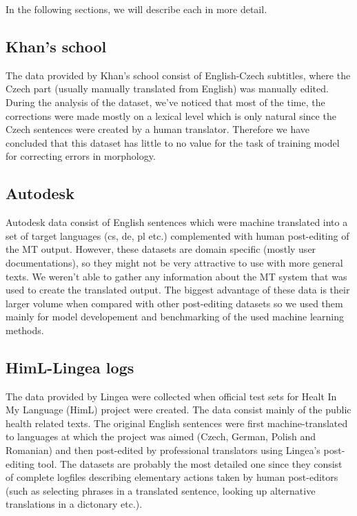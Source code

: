 In the following sections, we will describe each in more detail.

\subsection{Khan's school}

The data provided by Khan's school consist of English-Czech subtitles,
where the Czech part (usually manually translated from English) was manually
edited. During the analysis of the dataset,
we've noticed that most of the time, the corrections were made
mostly on a lexical level which is only natural since the Czech sentences
were created by a human translator.
Therefore we have concluded that this dataset has little to no value
for the task of training model for correcting errors in morphology.


\subsection{Autodesk}

Autodesk data consist of English sentences which were machine translated into
a set of target languages (cs, de, pl etc.) complemented with human post-editing
of the MT output. However, these datasets are domain specific (mostly user documentations),
so they might not be very attractive to use with more general texts.
We weren't able to gather any information about the MT system that was used
to create the translated output. The biggest advantage of these data is
their larger volume when compared with other post-editing datasets so we
used them mainly for model developement and benchmarking of the used machine
learning methods.

\subsection{HimL-Lingea logs}

The data provided by Lingea were collected when official test sets for
Healt In My Language (HimL) project were
created. The data consist mainly of the public health related texts.
The original English sentences were first
machine-translated to languages at which
the project was aimed (Czech, German, Polish and Romanian)
and then post-edited by professional
translators using Lingea's post-editing tool. The datasets are probably the most
detailed one since they consist of complete logfiles
describing elementary actions taken by human post-editors (such as selecting
phrases in a translated sentence, looking up alternative translations
in a dictonary etc.).

